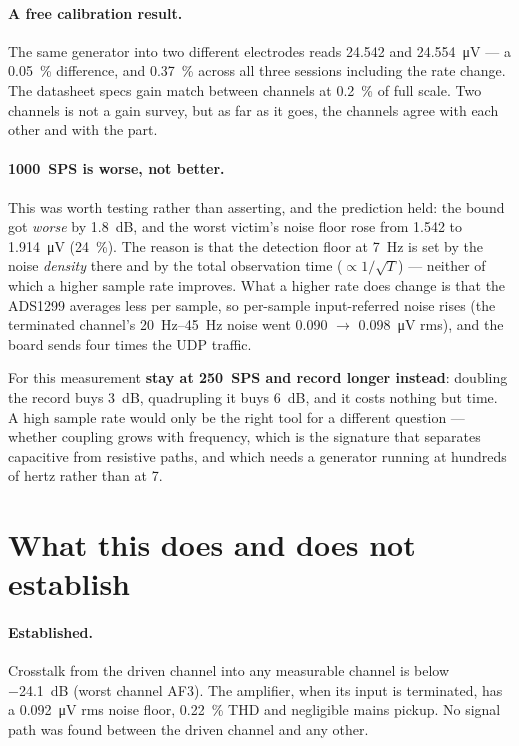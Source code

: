 \documentclass[11pt,a4paper]{article}
\begin{document}
\paragraph{A free calibration result.} The same generator into two different electrodes reads
\SI{24.542}{} and \SI{24.554}{\micro\volt} --- a \SI{0.05}{\percent} difference, and
\SI{0.37}{\percent} across all three sessions including the rate change. The datasheet specs
gain match between channels at \SI{0.2}{\percent} of full scale. Two channels is not a gain
survey, but as far as it goes, the channels agree with each other and with the part.

\paragraph{\SI{1000}{SPS} is worse, not better.} This was worth testing rather than asserting,
and the prediction held: the bound got \emph{worse} by \SI{1.8}{\deci\bel}, and the worst
victim's noise floor rose from \SI{1.542}{} to \SI{1.914}{\micro\volt} (\SI{+24}{\percent}).
The reason is that the detection floor at \SI{7}{\hertz} is set by the noise \emph{density}
there and by the total observation time ($\propto 1/\sqrt{T}$) --- neither of which a higher
sample rate improves. What a higher rate does change is that the ADS1299 averages less per
sample, so per-sample input-referred noise rises (the terminated channel's \SIrange{20}{45}{\hertz}
noise went \SI{0.090}{} $\to$ \SI{0.098}{\micro\volt} rms), and the board sends four times the
UDP traffic.

For this measurement \textbf{stay at \SI{250}{SPS} and record longer instead}: doubling the
record buys \SI{3}{\deci\bel}, quadrupling it buys \SI{6}{\deci\bel}, and it costs nothing but
time. A high sample rate would only be the right tool for a different question --- whether
coupling grows with frequency, which is the signature that separates capacitive from resistive
paths, and which needs a generator running at hundreds of hertz rather than at 7.

\section{What this does and does not establish}

\paragraph{Established.} Crosstalk from the driven channel into any measurable channel is below
\SI{-24.1}{\deci\bel} (worst channel AF3). The amplifier, when its input is terminated, has a
\SI{0.092}{\micro\volt} rms noise floor, \SI{0.22}{\percent} THD and negligible mains pickup.
No signal path was found between the driven channel and any other.
\end{document}
